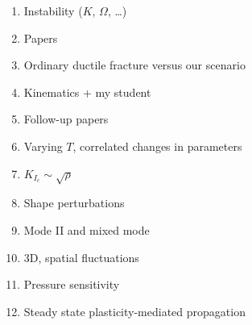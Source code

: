 \documentclass[12pt]{article}
\begin{document}
\begin{enumerate}
  \item Instability ($K$, $\Omega$, \ldots)
  \item Papers
  \item Ordinary ductile fracture versus our scenario
  \item Kinematics + my student
  \item Follow-up papers
  \item Varying $T$, correlated changes in parameters
  \item $K_{I_c} \sim \sqrt{\rho}$
  \item Shape perturbations
  \item Mode II and mixed mode
  \item 3D, spatial fluctuations
  \item Pressure sensitivity
  \item Steady state plasticity-mediated propagation
\end{enumerate}
\end{document}
